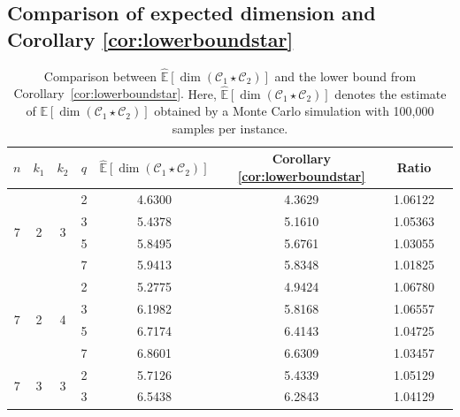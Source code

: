 \documentclass[a4paper,11pt,reqno]{article}
\newcommand{\C}{\mathcal{C}}
\theoremstyle{plain} \numberwithin{equation}{section}
\theoremstyle{definition}
\begin{document}
\pagebreak 
\begin{appendices}

\section{Comparison of expected dimension and Corollary \ref{cor:lowerboundstar}} \label{app:table}


\begin{table}[!ht]
\footnotesize
\centering
\captionsetup{width=0.95\textwidth}
\caption{{Comparison between $\hat{\mathbb{E}}[\dim(\mathcal{C}_1 \star \mathcal{C}_2)]$ and the lower bound from Corollary~\ref{cor:lowerboundstar}. {Here, $\hat{\mathbb{E}}[\dim(\mathcal{C}_1 \star \mathcal{C}_2)]$ denotes the estimate of $\mathbb{E}[\dim(\mathcal{C}_1 \star \mathcal{C}_2)]$ obtained by a Monte Carlo simulation with 100,000 samples per instance.} 
}}
\label{tab:lowerboundexperiments}
\begin{tabular}{|c|c|c|c|c|c|c|c|}
\hline
$n$                & $k_1$              & $k_2$              & $q$ & $\hat{\mathbb{E}}[\dim (\C_1\star\C_2)]$ & Corollary \ref{cor:lowerboundstar} & Ratio \\
\hline
\multirow{4}{*}{7}  & \multirow{4}{*}{2} & \multirow{4}{*}{3} & 2   & 4.6300 & 4.3629 & 1.06122 \\
                    &                    &                    & 3   & 5.4378 & 5.1610 & 1.05363 \\
                    &                    &                    & 5   & 5.8495 & 5.6761 & 1.03055 \\
                    &                    &                    & 7   & 5.9413 & 5.8348 & 1.01825 \\
\hline
\multirow{4}{*}{7}  & \multirow{4}{*}{2} & \multirow{4}{*}{4} & 2   & 5.2775 & 4.9424 & 1.06780 \\
                    &                    &                    & 3   & 6.1982 & 5.8168 & 1.06557 \\
                    &                    &                    & 5   & 6.7174 & 6.4143 & 1.04725 \\
                    &                    &                    & 7   & 6.8601 & 6.6309 & 1.03457 \\
\hline
\multirow{4}{*}{7}  & \multirow{4}{*}{3} & \multirow{4}{*}{3} & 2   & 5.7126 & 5.4339 & 1.05129 \\
                    &                    &                    & 3   & 6.5438 & 6.2843 & 1.04129 \\

\end{tabular}
\end{table}
\end{appendices}
\end{document}
